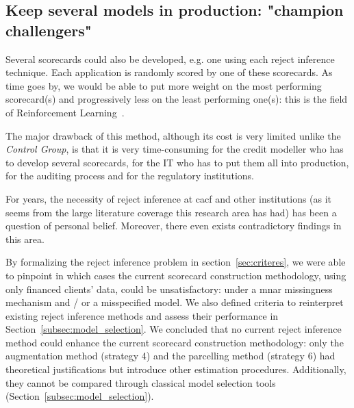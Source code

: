 \subsection{Keep several models in production: "champion challengers"}

Several scorecards could also be developed, e.g. one using each {reject inference} technique. Each application is randomly scored by one of these scorecards. As time goes by, we would be able to put more weight on the most performing scorecard(s) and progressively less on the least performing one(s): this is the field of Reinforcement Learning~\cite{Sutton1998}.

The major drawback of this method, although its cost is very limited unlike the \textit{Control Group}, is that it is very time-consuming for the credit modeller who has to develop several scorecards, for the IT who has to put them all into production, for the auditing process and for the regulatory institutions.

\bigskip

For years, the necessity of {reject inference} at \gls{cacf} and other institutions (as it seems from the large literature coverage this research area has had) has been a question of personal belief. Moreover, there even exists contradictory findings in this area.

By formalizing the {reject inference} problem in section~\ref{sec:criteres}, we were able to pinpoint in which cases the current scorecard construction methodology, using only financed clients' data, could be unsatisfactory: under a \gls{mnar} missingness mechanism and / or a misspecified model. We also defined criteria to reinterpret existing {reject inference} methods and assess their performance in Section~\ref{subsec:model_selection}. We concluded that no current {reject inference} method could enhance the current scorecard construction methodology: only the augmentation method (strategy 4) and the parcelling method (strategy 6) had theoretical justifications but introduce other estimation procedures. Additionally, they cannot be compared through classical model selection tools (Section~\ref{subsec:model_selection}).

